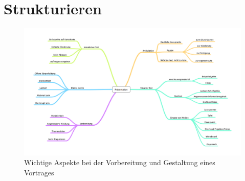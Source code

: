 \documentclass{lib/wa}
\begin{document}

\section{Strukturieren}

  \begin{figure}[ht]
    \centering
    \includegraphics[width=\textwidth]{assets/praesentation.png}
    \caption{Wichtige Aspekte bei der Vorbereitung und Gestaltung eines Vortrages}
  \end{figure}


\newpage



\end{document}
